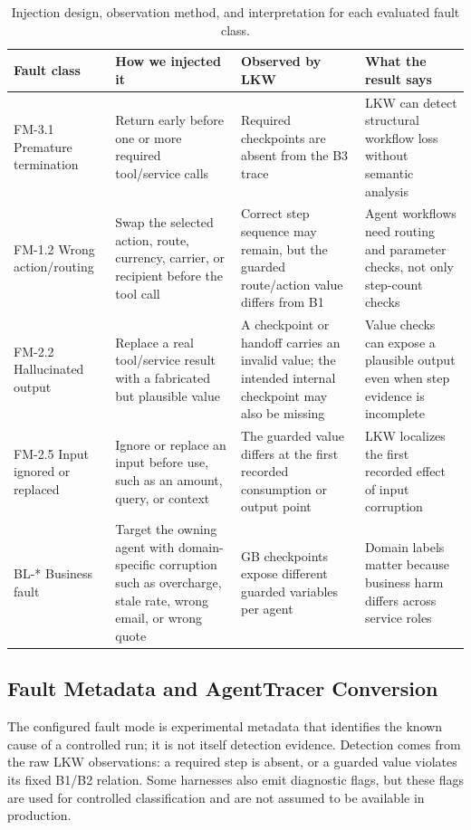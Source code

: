 \documentclass[sigconf,review,anonymous,balance=false]{acmart}
\begin{document}
\begin{table}[t]
\centering
\caption{Injection design, observation method, and interpretation for each
evaluated fault class.}
\label{tab:injection-design}
\begin{tabularx}{\textwidth}{lYYY}
\toprule
\textbf{Fault class} & \textbf{How we injected it} & \textbf{Observed by LKW} & \textbf{What the result says} \\
\midrule
FM-3.1 Premature termination
      & Return early before one or more required tool/service calls
      & Required checkpoints are absent from the B3 trace
      & LKW can detect structural workflow loss without semantic analysis \\
FM-1.2 Wrong action/routing
      & Swap the selected action, route, currency, carrier, or recipient before the tool call
      & Correct step sequence may remain, but the guarded route/action value differs from B1
      & Agent workflows need routing and parameter checks, not only step-count checks \\
FM-2.2 Hallucinated output
      & Replace a real tool/service result with a fabricated but plausible value
      & A checkpoint or handoff carries an invalid value; the intended internal checkpoint may also be missing
      & Value checks can expose a plausible output even when step evidence is incomplete \\
FM-2.5 Input ignored or replaced
      & Ignore or replace an input before use, such as an amount, query, or context
      & The guarded value differs at the first recorded consumption or output point
      & LKW localizes the first recorded effect of input corruption \\
BL-* Business fault
      & Target the owning agent with domain-specific corruption such as overcharge, stale rate, wrong email, or wrong quote
      & GB checkpoints expose different guarded variables per agent
      & Domain labels matter because business harm differs across service roles \\
\bottomrule
\end{tabularx}
\end{table}

\subsection{Fault Metadata and AgentTracer Conversion}

The configured fault mode is experimental metadata that identifies the known
cause of a controlled run; it is not itself detection evidence. Detection comes
from the raw LKW observations: a required step is absent, or a guarded value
violates its fixed B1/B2 relation. Some harnesses also emit diagnostic flags,
but these flags are used for controlled classification and are not assumed to
be available in production.
\end{document}
